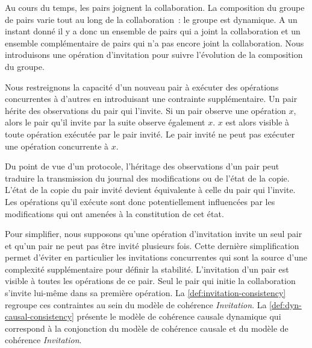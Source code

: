 Au cours du temps, les pairs joignent la collaboration.
La composition du groupe de pairs varie tout au long de la collaboration~: le groupe est dynamique.
A un instant donné il y a donc un ensemble de pairs qui a joint la collaboration et un ensemble complémentaire de pairs qui n'a pas encore joint la collaboration.
Nous introduisons une opération d'invitation pour suivre l'évolution de la composition du groupe.

Nous restreignons la capacité d'un nouveau pair à exécuter des opérations concurrentes à d'autres en introduisant une contrainte supplémentaire.
Un pair hérite des observations du pair qui l'invite.
Si un pair observe une opération $x$, alors le pair qu'il invite par la suite observe également $x$.
$x$ est alors visible à toute opération exécutée par le pair invité.
Le pair invité ne peut pas exécuter une opération concurrente à $x$.

Du point de vue d'un protocole, l'héritage des observations d'un pair peut traduire la transmission du journal des modifications ou de l'état de la copie.
L'état de la copie du pair invité devient équivalente à celle du pair qui l'invite.
Les opérations qu'il exécute sont donc potentiellement influencées par les modifications qui ont amenées à la constitution de cet état.

Pour simplifier, nous supposons qu'une opération d'invitation invite un seul pair et qu'un pair ne peut pas être invité plusieurs fois.
Cette dernière simplification permet d'éviter en particulier les invitations concurrentes qui sont la source d'une complexité supplémentaire pour définir la stabilité.
L'invitation d'un pair est visible à toutes les opérations de ce pair.
Seul le pair qui initie la collaboration s'invite lui-même dans sa première opération.
La \autoref{def:invitation-consistency} regroupe ces contraintes au sein du modèle de cohérence \emph{Invitation}.
La \autoref{def:dyn-causal-consistency} présente le modèle de cohérence causale dynamique qui correspond à la conjonction du modèle de cohérence causale et du modèle de cohérence \emph{Invitation}.



